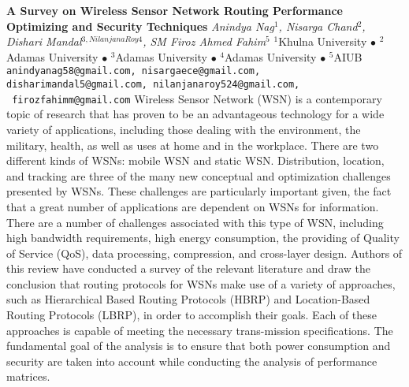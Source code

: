 
    \begin{conf-abstract}[]
        {\textbf{A Survey on Wireless Sensor Network Routing Performance Optimizing and Security Techniques}}
        {\textit{Anindya Nag$^{1}$, Nisarga Chand$^{2}$, Dishari  Mandal$^{3,Nilanjana  Roy4}$, SM Firoz Ahmed  Fahim$^{5}$}}
        {$^{1}$Khulna University $\bullet$ $^{2}$Adamas University $\bullet$ $^{3}$Adamas University $\bullet$ $^{4}$Adamas University $\bullet$ $^{5}$AIUB}
        {\texttt{anindyanag58@gmail.com, nisargaece@gmail.com, disharimandal5@gmail.com, nilanjanaroy524@gmail.com,  firozfahimm@gmail.com}}
        {Wireless Sensor Network (WSN) is a contemporary topic of research that has proven to be an advantageous technology for a wide variety of applications, including those dealing with the environment, the military, health, as well as uses at home and in the workplace. There are two different kinds of WSNs: mobile WSN and static WSN. Distribution, location, and tracking are three of the many new conceptual and optimization challenges presented by WSNs. These challenges are particularly important given, the fact that a great number of applications are dependent on WSNs for information. There are a number of challenges associated with this type of WSN, including high bandwidth requirements, high energy consumption, the providing of Quality of Service (QoS), data processing, compression, and cross-layer design. Authors of this review have conducted a survey of the relevant literature and draw the conclusion that routing protocols for WSNs make use of a variety of approaches, such as Hierarchical Based Routing Protocols (HBRP) and Location-Based Routing Protocols (LBRP), in order to accomplish their goals. Each of these approaches is capable of meeting the necessary trans-mission specifications. The fundamental goal of the analysis is to ensure that both power consumption and security are taken into account while conducting the analysis of performance matrices.}
    \end{conf-abstract}
        